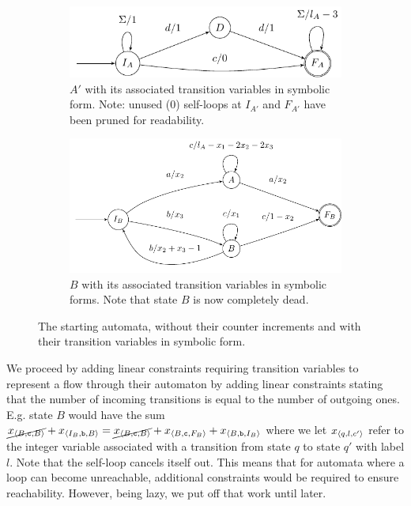\begin{figure}[h]
    \centering 
  \begin{subfigure}[b]{0.5\textwidth}
    \centering
    \includegraphics[scale=\autscale]{a_annotated}
    \caption{ $A'$ with its associated transition variables in symbolic form.
    Note: unused ($0$) self-loops at $I_{A'}$ and $F_{A'}$ have been pruned for
    readability.}\label{fig:aut_a_annotated}
  \end{subfigure}
  \begin{subfigure}[b]{0.5\textwidth}
    \centering
    \includegraphics[scale=\autscale]{b_annotated}
    \caption{$B$ with its associated transition variables in symbolic forms.
    Note that state $B$ is now completely dead.}\label{fig:aut_b_annotated}
  \end{subfigure}
  \caption{The starting automata, without their counter increments and with
  their transition variables in symbolic form.}\label{fig:propagated}
\end{figure}


We proceed by adding linear constraints requiring transition variables to
represent a flow through their automaton by adding linear constraints stating
that the number of incoming transitions is equal to the number of outgoing ones.
E.g. state $B$ would have the sum $\cancel{x_{\left\langle B, \texttt{c}, B\right\rangle}} +
x_{\left\langle I_B, \texttt{b}, B\right\rangle} = \cancel{x_{\left\langle B, \texttt{c}, B\right\rangle}}  +
x_{\left\langle B, \texttt{c}, F_B\right\rangle} + x_{\left\langle B, \texttt{b}, I_B\right\rangle}$ where we let
$x_{\left\langle q, l, c'\right\rangle}$ refer to the integer variable associated with a
transition from state $q$ to state $q'$ with label $l$. Note that the self-loop
cancels itself out. This means that for automata where a loop can become
unreachable, additional constraints would be required to ensure reachability.
However, being lazy, we put off that work until later.

